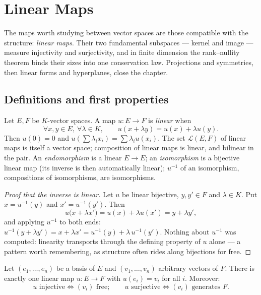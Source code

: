 \chapter{Linear Maps}\label{ch:b1:linmaps}

The maps worth studying between vector spaces are those compatible
with the structure: \emph{linear maps}. Their two fundamental
subspaces --- kernel and image --- measure injectivity and
surjectivity, and in finite dimension the rank--nullity theorem
binds their sizes into one conservation law. Projections and
symmetries, then linear forms and hyperplanes, close the chapter.

\section{Definitions and first properties}

\begin{definition}\label{def:b1:linmaps:def}
Let $E, F$ be $K$-vector spaces. A map $u \colon E \to F$ is
\emph{linear} when
\[
\forall x, y \in E,\ \forall \lambda \in K, \qquad
u(x + \lambda y) = u(x) + \lambda u(y).
\]
Then $u(0) = 0$ and $u(\sum \lambda_i x_i) = \sum \lambda_i u(x_i)$.
The set $\mathcal{L}(E, F)$ of linear maps is itself a vector space;
composition of linear maps is linear, and bilinear in the pair. An
\emph{endomorphism} is a linear $E \to E$; an \emph{isomorphism} is
a bijective linear map (its inverse is then automatically linear);
$u^{-1}$ of an isomorphism, compositions of isomorphisms, are
isomorphisms.
\end{definition}

\begin{proof}[Proof that the inverse is linear]
Let $u$ be linear bijective, $y, y' \in F$ and $\lambda \in K$.
Put $x = u^{-1}(y)$ and $x' = u^{-1}(y')$. Then
\[
u\bigl(x + \lambda x'\bigr) = u(x) + \lambda u(x')
= y + \lambda y' ,
\]
and applying $u^{-1}$ to both ends: $u^{-1}(y + \lambda y') = x
+ \lambda x' = u^{-1}(y) + \lambda\,u^{-1}(y')$. Nothing about
$u^{-1}$ was computed: linearity transports through the
defining property of $u$ alone --- a pattern worth remembering,
as structure often rides along bijections for free.
\end{proof}

\begin{proposition}\label{prop:b1:linmaps:basis}
Let $(e_1, \dots, e_n)$ be a basis of $E$ and $(v_1, \dots, v_n)$
arbitrary vectors of $F$. There is exactly one linear map $u \colon
E \to F$ with $u(e_i) = v_i$ for all $i$. Moreover:
\[
u \text{ injective} \iff (v_i) \text{ free};
\qquad
u \text{ surjective} \iff (v_i) \text{ generates } F .
\]
\end{proposition}

